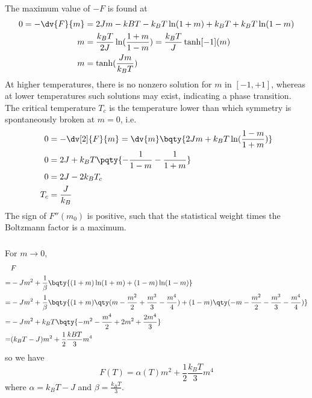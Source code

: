 \documentclass[12pt]{article}
\begin{document}
        \subsubsection{} The maximum value of \( -F\) is found at \begin{align*}
            0 = -\dv{F}{m} &= 2Jm - kBT - k_BT\ln(1 + m) + k_BT + k_BT\ln(1 - m)\\
            m &= \frac{k_BT}{2J}\ln(\frac{1 +m}{1 - m}) = \frac{k_BT}{J}\tanh[ - 1](m)\\
            m &= \tanh(\frac{Jm}{k_BT})
        \end{align*}
        At higher temperatures, there is no nonzero solution for \(m\) in \([ - 1, + 1]\), whereas at lower temperatures such solutions may exist, indicating a phase transition. The critical temperature \(T_c\) is the temperature lower than which symmetry is spontaneously broken at \(m = 0\), i.e. \begin{align*}
            0 &= -\dv[2]{F}{m} =  \dv{m}\bqty{2Jm + k_BT \ln(\frac{1 -m}{1 + m}) } \\
            0 &= 2J + k_BT \pqty{ - \frac{1}{1 - m} - \frac{1}{1 + m}} \\
            0 &= 2J - 2k_BT_c \\
            T_c &= \frac{J}{k_B}
        \end{align*}
        The sign of \(F''(m_0)\) is positive, such that the statistical weight times the Boltzmann factor is a maximum.
        \subsubsection{} For \(m \to 0\), \begin{align*}
            &F\\ =& - Jm^2 + \frac{1}{\beta}\bqty{(1 + m)\ln(1 + m) + (1 - m)\ln(1 - m)}\\
            =& - Jm^2 + \frac{1}{\beta}\bqty{(1 + m)\qty(m - \frac{m^2}{2} + \frac{m^3}{3} - \frac{m^4}{4}) + (1 - m)\qty( - m - \frac{m^2}{2} - \frac{m^3}{3} - \frac{m^4}{4})}\\
            =& - Jm^2 + k_BT\bqty{ -m^2 -\frac{m^4}{2} + 2m^2 + \frac{2m^4}{3}}\\
            =&(k_BT - J) m^2 + \frac{1}{2}\frac{kBT}{3} m^4
        \end{align*}
        so we have \[
            F(T) = \alpha(T) m^2 + \frac{1}{2} \frac{k_BT}{3}m^4
        \]
        where \(\alpha = k_BT - J\) and \(\beta = \frac{k_BT}{3} \).
\end{document}
